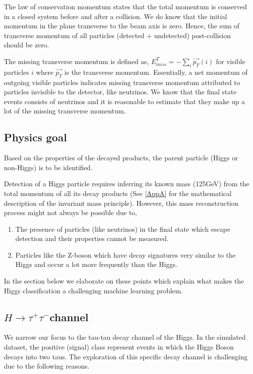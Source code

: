 \documentclass[final,3p,times,twocolumn]{elsarticle}
\begin{document}
The law of conservation momentum states that the total momentum is conserved in a closed system before and after a collision. We do know that the initial momentum in the plane transverse to the beam axis is zero. Hence, the sum of transverse momentum of all particles (detected + undetected) post-collision should be zero. 

The missing transverse momentum is defined as, $E_{miss}^{T} =  - \sum_{i} \vec{p_{T}}(i) $ for visible particles $i$ where $\vec{p_{T}}$ is the transverse momentum. Essentially, a net momentum of outgoing visible particles indicates missing transverse momentum attributed to particles invisible to the detector, like neutrinos. We know that the final state events consists of neutrinos and it is reasonable to estimate that they make up a lot of the missing transverse momentum.

\subsection {Physics goal} 

Based on the properties of the decayed products, the parent particle (Higgs or non-Higgs) is to be identified. \cite{RM}

Detection of a Higgs particle requires inferring its known mass (125GeV) from the total momentum of all its decay products (See \ref{AppA} for the mathematical description of the invariant mass principle). However, this mass reconstruction process might not always be possible due to, 

\begin{enumerate}
\item{The presence of particles (like neutrinos) in the final state which escape detection and their properties cannot be measured.}
\item{Particles like the Z-boson which have decay signatures very similar to the Higgs and occur a lot more frequently than the Higgs.}
\end{enumerate}
 
In the section below we elaborate on these points which explain what makes the Higgs classification a challenging machine learning problem.

\subsection{\texorpdfstring{$ H \rightarrow \tau^{+} \tau^{-} ${c}}channel}
\label{H-TT}

We narrow our focus to the tau-tau decay channel of the Higgs. In the simulated dataset, the positive (signal) class represent events in which the Higgs Boson decays into two taus. The exploration of this specific decay channel is challenging due to the following reasons. 
\end{document}
